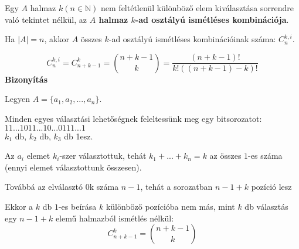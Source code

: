 \begin{frame}
  \begin{tcolorbox}[title={Def.: Ismétléses Kombináció}]
    Egy $A$ halmaz $k (n \in \mathbb{N})$ nem feltétlenül különböző elem kiválasztása sorrendre való tekintet nélkül, az \textbf{$A$ halmaz  $k$-ad osztályú ismétléses kombinációja}.\\
    \msmallskip
    
    Ha $|A| = n$, akkor $A$ összes $k$-ad osztályú ismétléses kombinációinak száma: $C_n^{k, i}$.
  \end{tcolorbox}

  \begin{tcolorbox}[title={Tétel: Ismétléses kombinációk száma}]
    $$C_n^{k, i} = C_{n + k -1}^k = {{n + k - 1}\choose{k}} = \frac{(n + k - 1)!}{k!((n + k - 1) - k)!}$$
  \tcblower
    \textbf{Bizonyítás}\\
    \mmedskip

    Legyen $A = \{a_1, a_2, ..., a_n\}$.\\
    \msmallskip
    
    Minden egyes választási lehetőségnek feleltessünk meg egy bitsorozatot:\\
    $1 1 ... 1 0 1 1 ... 1 0 ... 0 1 1 1 ... 1$\\
    $k_1$ db,    $k_2$ db,         $k_3$ db 1esz.\\
    \msmallskip
    
    Az $a_i$ elemet $k_i$-szer választottuk, tehát $k_1 + ... + k_n = k$ az összes $1$-es száma (ennyi elemet választottunk összesen).\\
    \msmallskip
    
    Továbbá az elválasztó $0$k száma $n - 1$, tehát a sorozatban $n - 1 + k$ pozíció lesz\\
    \mmedskip

    Ekkor a $k$ db $1$-es beírása $k$ különböző pozícióba nem más, mint $k$ db választás egy $n - 1 + k$ elemű halmazból ismétlés nélkül:\\
    $$C_{n + k - 1}^k = {n + k - 1 \choose k}$$
  \end{tcolorbox}
\end{frame}

